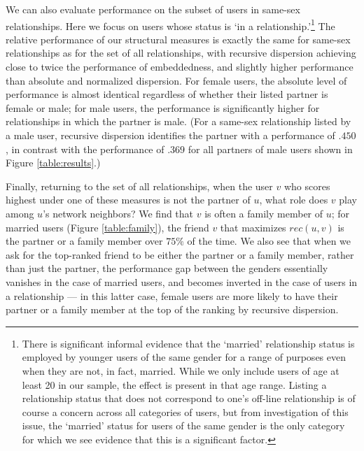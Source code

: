 \documentclass{sigchi}
\begin{document}
We can also evaluate performance on the subset of users in same-sex
relationships.  Here we focus on users whose status is
`in a relationship.'\footnote{There is significant informal
evidence that the `married' relationship status is employed
by younger users of the same gender for a range of purposes even
when they are not, in fact, married.  While we only include users
of age at least 20 in our sample, the effect is present in that age range.
Listing a relationship status
that does not correspond to one's off-line relationship is of course
a concern across all categories of users, but from investigation of this
issue, the `married' status for users
of the same gender is the only category for which we see evidence
that this is a significant factor.}
The relative performance of our structural measures is exactly
the same for same-sex relationships as for the set of
all relationships, with recursive dispersion achieving close
to twice the performance of embeddedness, and slightly higher performance
than absolute and normalized dispersion.
For female users, the absolute level of performance is almost
identical regardless of whether their listed partner is female or male;
for male users, the performance is significantly higher for
relationships in which the partner is male.
(For a same-sex relationship listed by a male user,
recursive dispersion identifies the partner with a performance
of $.450$, in contrast with the performance of $.369$ for all
partners of male users shown in Figure \ref{table:results}.)

Finally, returning to the set of all relationships,
when the user $v$ who scores highest under one of these measures
is not the partner of $u$, what role does $v$ play among $u$'s
network neighbors?
We find that $v$ is often a family member of $u$;
for married users (Figure \ref{table:family}), the friend $v$ that
maximizes $rec(u,v)$ is the partner or a family member over $75\%$
of the time.
We also see that when we ask for the top-ranked friend to be
either the partner or a family member, rather than just the partner,
the performance gap between the genders essentially vanishes
in the case of married users, and becomes inverted in the case
of users in a relationship --- in this latter case, female users
are more likely to have their partner or a family member at the top
of the ranking by recursive dispersion.
\end{document}
